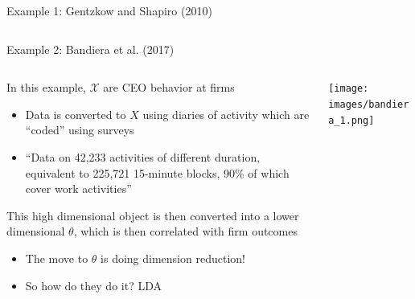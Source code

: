 \documentclass[notes,11pt, aspectratio=169]{beamer}
\newenvironment{wideitemize}{\itemize\addtolength{\itemsep}{10pt}}{\enditemize}
\begin{document}
\begin{frame}{Example 1: Gentzkow and Shapiro (2010)}
\begin{columns}[onlytextwidth, T]
\begin{column}{.5\textwidth}
    \end{column}%
  \end{columns}
\end{frame}




\begin{frame}{Example 2: Bandiera et al. (2017)}
    \begin{columns}[onlytextwidth, T] %
      \begin{column}{.5\textwidth}
        \begin{wideitemize}
        \item In this example, $\mathcal{X}$ are CEO behavior at firms
          \begin{itemize}
          \item Data is converted to $X$ using diaries of activity
            which are ``coded'' using surveys
          \item ``Data on 42,233 activities of different duration,
            equivalent to 225,721 15-minute blocks, 90\% of which
            cover work activities''
          \end{itemize}
        \item This high dimensional object is then converted into a lower dimensional $\theta$, which is then correlated with firm outcomes
          \begin{itemize}
          \item The move to $\theta$ is doing dimension reduction!
          \item So how do they do it? LDA
          \end{itemize}
        \end{wideitemize}
      \end{column}%
      \hfill%
      \begin{column}{.5\textwidth}
        \texttt{[image: images/bandiera\_1.png]}
      \end{column}%
    \end{columns}
  \end{frame}
\end{document}
